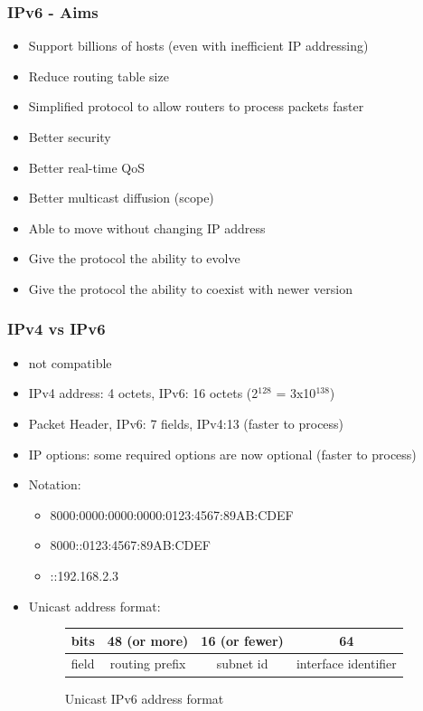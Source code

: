   \begin{frame}
    \frametitle{IPv6 - Aims}
    \begin{itemize}
      \item Support billions of hosts (even with inefficient IP addressing)
      \item Reduce routing table size
      \item Simplified protocol to allow routers to process packets faster
      \item Better security
      \item Better real-time QoS
      \item Better multicast diffusion (scope)
      \item Able to move without changing IP address
      \item Give the protocol the ability to evolve
      \item Give the protocol the ability to coexist with newer version
    \end{itemize}
  \end{frame}

  \begin{frame}
    \frametitle{IPv4 vs IPv6}
    \begin{itemize}
      \item not compatible
      \item IPv4 address: 4 octets, IPv6: 16 octets (2$^{128}$ = 3x10$^{138}$)
      \item Packet Header, IPv6: 7 fields, IPv4:13 (faster to process)
      \item IP options: some required options are now optional (faster to process)
      \item Notation:
        \begin{itemize}
          \item 8000:0000:0000:0000:0123:4567:89AB:CDEF
          \item 8000::0123:4567:89AB:CDEF
          \item ::192.168.2.3
        \end{itemize}
      \item Unicast address format:
      \begin{figure}
        \centering
        \begin{tabular}{l|c|c|c}
          bits & 48 (or more) & 16 (or fewer) & 64 \\ \hline
          field & routing prefix & subnet id & interface identifier \\
        \end{tabular}
        \caption{Unicast IPv6 address format}
        \label{fig:uni-ipv6-address}
      \end{figure}
    \end{itemize}
  \end{frame}


